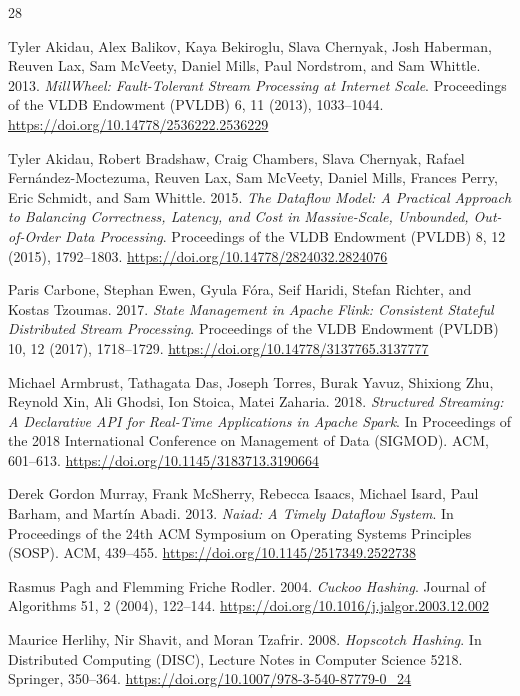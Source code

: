 \documentclass[sigconf]{acmart}
\begin{document}
\begin{thebibliography}{28}

Tyler Akidau, Alex Balikov, Kaya Bekiroglu, Slava Chernyak, Josh Haberman, Reuven Lax, Sam McVeety, Daniel Mills, Paul Nordstrom, and Sam Whittle.
2013.
\textit{MillWheel: Fault-Tolerant Stream Processing at Internet Scale}.
Proceedings of the VLDB Endowment (PVLDB) 6, 11 (2013), 1033--1044.
\url{https://doi.org/10.14778/2536222.2536229}

Tyler Akidau, Robert Bradshaw, Craig Chambers, Slava Chernyak, Rafael Fern{\'a}ndez-Moctezuma, Reuven Lax, Sam McVeety, Daniel Mills, Frances Perry, Eric Schmidt, and Sam Whittle.
2015.
\textit{The Dataflow Model: A Practical Approach to Balancing Correctness, Latency, and Cost in Massive-Scale, Unbounded, Out-of-Order Data Processing}.
Proceedings of the VLDB Endowment (PVLDB) 8, 12 (2015), 1792--1803.
\url{https://doi.org/10.14778/2824032.2824076}

Paris Carbone, Stephan Ewen, Gyula F{\'o}ra, Seif Haridi, Stefan Richter, and Kostas Tzoumas.
2017.
\textit{State Management in Apache Flink{\textregistered}: Consistent Stateful Distributed Stream Processing}.
Proceedings of the VLDB Endowment (PVLDB) 10, 12 (2017), 1718--1729.
\url{https://doi.org/10.14778/3137765.3137777}

Michael Armbrust, Tathagata Das, Joseph Torres, Burak Yavuz, Shixiong Zhu, Reynold Xin, Ali Ghodsi, Ion Stoica, Matei Zaharia.
2018.
\textit{Structured Streaming: A Declarative API for Real-Time Applications in Apache Spark}.
In Proceedings of the 2018 International Conference on Management of Data (SIGMOD). ACM, 601--613.
\url{https://doi.org/10.1145/3183713.3190664}

Derek Gordon Murray, Frank McSherry, Rebecca Isaacs, Michael Isard, Paul Barham, and Mart{\'i}n Abadi.
2013.
\textit{Naiad: A Timely Dataflow System}.
In Proceedings of the 24th ACM Symposium on Operating Systems Principles (SOSP). ACM, 439--455.
\url{https://doi.org/10.1145/2517349.2522738}

Rasmus Pagh and Flemming Friche Rodler.
2004.
\textit{Cuckoo Hashing}.
Journal of Algorithms 51, 2 (2004), 122--144.
\url{https://doi.org/10.1016/j.jalgor.2003.12.002}

Maurice Herlihy, Nir Shavit, and Moran Tzafrir.
2008.
\textit{Hopscotch Hashing}.
In Distributed Computing (DISC), Lecture Notes in Computer Science 5218. Springer, 350--364.
\url{https://doi.org/10.1007/978-3-540-87779-0_24}


\end{thebibliography}
\end{document}
